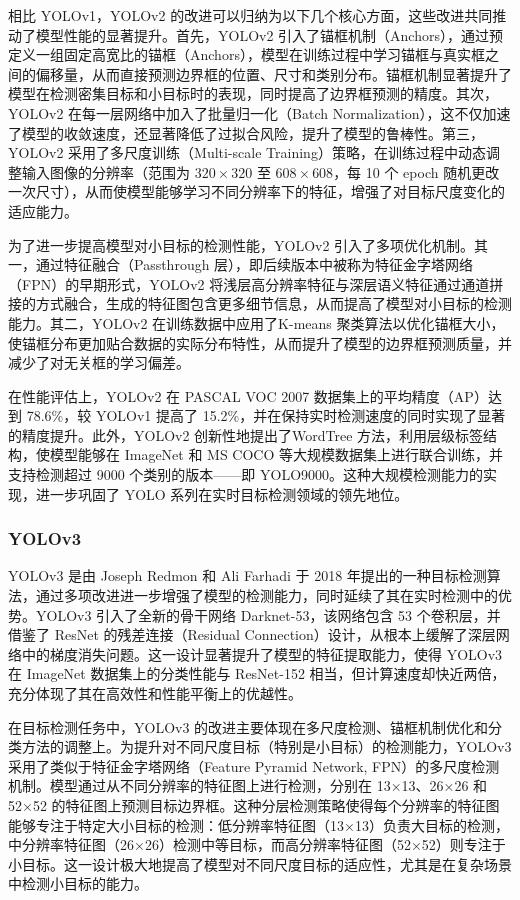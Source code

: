 \documentclass[11pt,twocolumn]{ctexart}
\begin{document}
相比 YOLOv1，YOLOv2 的改进可以归纳为以下几个核心方面，这些改进共同推动了模型性能的显著提升。首先，YOLOv2 引入了锚框机制（Anchors），通过预定义一组固定高宽比的锚框（Anchors），模型在训练过程中学习锚框与真实框之间的偏移量，从而直接预测边界框的位置、尺寸和类别分布。锚框机制显著提升了模型在检测密集目标和小目标时的表现，同时提高了边界框预测的精度。其次，YOLOv2 在每一层网络中加入了批量归一化（Batch Normalization），这不仅加速了模型的收敛速度，还显著降低了过拟合风险，提升了模型的鲁棒性。第三，YOLOv2 采用了多尺度训练（Multi-scale Training）策略，在训练过程中动态调整输入图像的分辨率（范围为 $320 \times 320$ 至 $608 \times 608$，每 10 个 epoch 随机更改一次尺寸），从而使模型能够学习不同分辨率下的特征，增强了对目标尺度变化的适应能力。

为了进一步提高模型对小目标的检测性能，YOLOv2 引入了多项优化机制。其一，通过特征融合（Passthrough 层），即后续版本中被称为特征金字塔网络（FPN）的早期形式，YOLOv2 将浅层高分辨率特征与深层语义特征通过通道拼接的方式融合，生成的特征图包含更多细节信息，从而提高了模型对小目标的检测能力。其二，YOLOv2 在训练数据中应用了K-means 聚类算法以优化锚框大小，使锚框分布更加贴合数据的实际分布特性，从而提升了模型的边界框预测质量，并减少了对无关框的学习偏差。

在性能评估上，YOLOv2 在 PASCAL VOC 2007 数据集上的平均精度（AP）达到 78.6\%，较 YOLOv1 提高了 15.2\%，并在保持实时检测速度的同时实现了显著的精度提升。此外，YOLOv2 创新性地提出了WordTree 方法，利用层级标签结构，使模型能够在 ImageNet 和 MS COCO 等大规模数据集上进行联合训练，并支持检测超过 9000 个类别的版本——即 YOLO9000。这种大规模检测能力的实现，进一步巩固了 YOLO 系列在实时目标检测领域的领先地位。
\subsubsection{YOLOv3}
YOLOv3 是由 Joseph Redmon 和 Ali Farhadi 于 2018 年提出的一种目标检测算法，通过多项改进进一步增强了模型的检测能力，同时延续了其在实时检测中的优势。YOLOv3 引入了全新的骨干网络 Darknet-53，该网络包含 53 个卷积层，并借鉴了 ResNet 的残差连接（Residual Connection）设计，从根本上缓解了深层网络中的梯度消失问题。这一设计显著提升了模型的特征提取能力，使得 YOLOv3 在 ImageNet 数据集上的分类性能与 ResNet-152 相当，但计算速度却快近两倍，充分体现了其在高效性和性能平衡上的优越性。

在目标检测任务中，YOLOv3 的改进主要体现在多尺度检测、锚框机制优化和分类方法的调整上。为提升对不同尺度目标（特别是小目标）的检测能力，YOLOv3 采用了类似于特征金字塔网络（Feature Pyramid Network, FPN）的多尺度检测机制。模型通过从不同分辨率的特征图上进行检测，分别在 13×13、26×26 和 52×52 的特征图上预测目标边界框。这种分层检测策略使得每个分辨率的特征图能够专注于特定大小目标的检测：低分辨率特征图（13×13）负责大目标的检测，中分辨率特征图（26×26）检测中等目标，而高分辨率特征图（52×52）则专注于小目标。这一设计极大地提高了模型对不同尺度目标的适应性，尤其是在复杂场景中检测小目标的能力。
\end{document}
